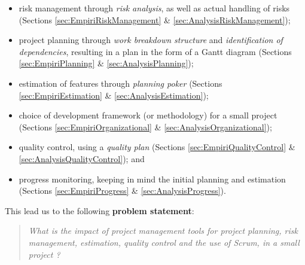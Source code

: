 \begin{itemize} \item risk management through \emph{risk analysis}, as well as
		actual handling of risks (Sections
	\ref{sec:EmpiriRiskManagement} \& \ref{sec:AnalysisRiskManagement});
	\item project planning through \emph{work breakdown structure} and
		\emph{identification of dependencies}, resulting in a plan in
	the form of a Gantt diagram (Sections \ref{sec:EmpiriPlanning} \&
	\ref{sec:AnalysisPlanning}); \item estimation of features through
		\emph{planning poker} (Sections \ref{sec:EmpiriEstimation} \&
		\ref{sec:AnalysisEstimation}); \item choice of development
		framework (or methodology) for a small project (Sections
	\ref{sec:EmpiriOrganizational} \& \ref{sec:AnalysisOrganizational});
	\item quality control, using a \emph{quality plan} (Sections
		\ref{sec:EmpiriQualityControl} \&
		\ref{sec:AnalysisQualityControl}); and \item progress
	monitoring, keeping in mind the initial planning and estimation
	(Sections \ref{sec:EmpiriProgress} \& \ref{sec:AnalysisProgress}).
\end{itemize}

This lead us to the following \textbf{problem statement}:
\begin{quote}
\emph{
What is the impact of project management tools for project planning, risk management, estimation, quality control and the use of Scrum, in a small project ?
}
\end{quote}
